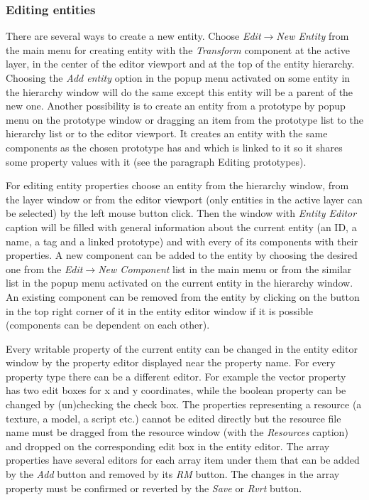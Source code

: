 \subsubsection{Editing entities}

There are several ways to create a new entity. Choose \emph{Edit}$\rightarrow$\emph{New Entity} from the main menu for creating entity with the \emph{Transform} component at the active layer, in the center of the editor viewport and at the top of the entity hierarchy. Choosing the \emph{Add entity} option in the popup menu activated on some entity in the hierarchy window will do the same except this entity will be a parent of the new one. Another possibility is to create an entity from a prototype by popup menu on the prototype window or dragging an item from the prototype list to the hierarchy list or to the editor viewport. It creates an entity with the same components as the chosen prototype has and which is linked to it so it shares some property values with it (see the paragraph Editing prototypes).

For editing entity properties choose an entity from the hierarchy window, from the layer window or from the editor viewport (only entities in the active layer can be selected) by the left mouse button click. Then the window with \emph{Entity Editor} caption will be filled with general information about the current entity (an ID, a name, a tag and a linked prototype) and with every of its components with their properties. A new component can be added to the entity by choosing the desired one from the \emph{Edit}$\rightarrow$\emph{New Component} list in the main menu or from the similar list in the popup menu activated on the current entity in the hierarchy window. An existing component can be removed from the entity by clicking on the button in the top right corner of it in the entity editor window if it is possible (components can be dependent on each other).

Every writable property of the current entity can be changed in the entity editor window by the property editor displayed near the property name. For every property type there can be a different editor. For example the vector property has two edit boxes for x and y coordinates, while the boolean property can be changed by (un)checking the check box. The properties representing a resource (a texture, a model, a script etc.) cannot be edited directly but the resource file name must be dragged from the resource window (with the \emph{Resources} caption) and dropped on the corresponding edit box in the entity editor. The array properties have several editors for each array item under them that can be added by the \emph{Add} button and removed by its \emph{RM} button. The changes in the array property must be confirmed or reverted by the \emph{Save} or \emph{Rvrt} button.

